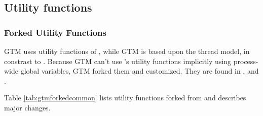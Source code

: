 
\subsection{Utility functions}



\subsubsection{Forked Utility Functions}

  GTM uses utility functions of \PG, while GTM is based upon the thread model, in constrast to \PG.
  Because GTM can't use \PG's utility functions implicitly using process-wide
  global variables,
  GTM forked them and customized.
  They are found in ,  and .
  
  Table \ref{tab:gtmforkedcommon} lists utility functions forked from \PG{} and
  describes major changes.
  
